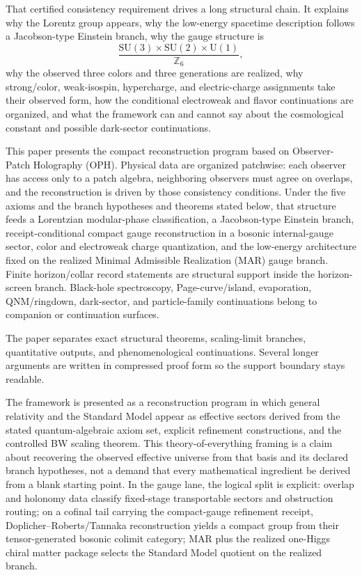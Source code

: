 \documentclass[11pt]{article}
\newcommand{\SU}{\mathrm{SU}}
\newcommand{\U}{\mathrm{U}}
\begin{document}
That certified consistency requirement drives a long structural chain. It explains why the Lorentz group appears, why the low-energy spacetime description follows a Jacobson-type Einstein branch, why the gauge structure is
\[
\frac{\SU(3)\times\SU(2)\times\U(1)}{\mathbb Z_6},
\]
why the observed three colors and three generations are realized, why strong/color, weak-isospin, hypercharge, and electric-charge assignments take their observed form, how the conditional electroweak and flavor continuations are organized, and what the framework can and cannot say about the cosmological constant and possible dark-sector continuations.

This paper presents the compact reconstruction program based on Observer-Patch Holography (OPH).
Physical data are organized patchwise: each observer has access only to a patch algebra,
neighboring observers must agree on overlaps, and the reconstruction is driven by those
consistency conditions. Under the five axioms and the branch hypotheses and theorems stated below,
that structure feeds a Lorentzian modular-phase classification, a Jacobson-type Einstein branch,
receipt-conditional compact gauge reconstruction in a bosonic internal-gauge sector, color and electroweak charge
quantization, and the low-energy architecture fixed on the realized Minimal Admissible Realization (MAR) gauge branch.
Finite horizon/collar record statements are structural support inside the horizon-screen branch.
Black-hole spectroscopy, Page-curve/island, evaporation, QNM/ringdown, dark-sector, and
particle-family continuations belong to companion or continuation surfaces.

The paper separates exact structural theorems, scaling-limit branches, quantitative outputs, and phenomenological continuations. Several longer arguments are written in compressed proof form so the support boundary stays readable.

The framework is presented as a reconstruction program in which general relativity and the Standard Model appear as effective sectors derived from the stated quantum-algebraic axiom set, explicit refinement constructions, and the controlled BW scaling theorem. This theory-of-everything framing is a claim about recovering the observed effective universe from that basis and its declared branch hypotheses, not a demand that every mathematical ingredient be derived from a blank starting point. In the gauge lane, the logical split is explicit: overlap and holonomy data classify fixed-stage transportable sectors and obstruction routing; on a cofinal tail carrying the compact-gauge refinement receipt, Doplicher--Roberts/Tannaka reconstruction yields a compact group from their tensor-generated bosonic colimit category; MAR plus the realized one-Higgs chiral matter package selects the Standard Model quotient on the realized branch.
\end{document}
